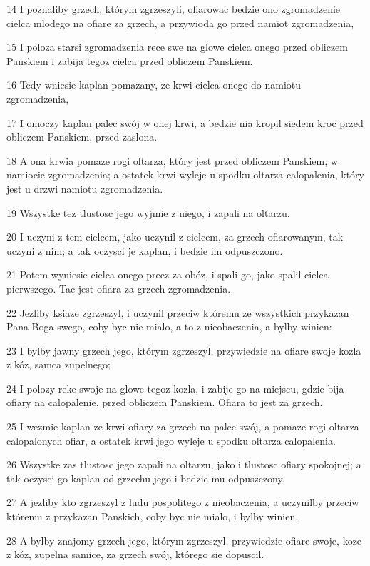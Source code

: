 \par 14 I poznaliby grzech, którym zgrzeszyli, ofiarowac bedzie ono zgromadzenie cielca mlodego na ofiare za grzech, a przywioda go przed namiot zgromadzenia,
\par 15 I poloza starsi zgromadzenia rece swe na glowe cielca onego przed obliczem Panskiem i zabija tegoz cielca przed obliczem Panskiem.
\par 16 Tedy wniesie kaplan pomazany, ze krwi cielca onego do namiotu zgromadzenia,
\par 17 I omoczy kaplan palec swój w onej krwi, a bedzie nia kropil siedem kroc przed obliczem Panskiem, przed zaslona.
\par 18 A ona krwia pomaze rogi oltarza, który jest przed obliczem Panskiem, w namiocie zgromadzenia; a ostatek krwi wyleje u spodku oltarza calopalenia, który jest u drzwi namiotu zgromadzenia.
\par 19 Wszystke tez tlustosc jego wyjmie z niego, i zapali na oltarzu.
\par 20 I uczyni z tem cielcem, jako uczynil z cielcem, za grzech ofiarowanym, tak uczyni z nim; a tak oczysci je kaplan, i bedzie im odpuszczono.
\par 21 Potem wyniesie cielca onego precz za obóz, i spali go, jako spalil cielca pierwszego. Tac jest ofiara za grzech zgromadzenia.
\par 22 Jezliby ksiaze zgrzeszyl, i uczynil przeciw któremu ze wszystkich przykazan Pana Boga swego, coby byc nie mialo, a to z nieobaczenia, a bylby winien:
\par 23 I bylby jawny grzech jego, którym zgrzeszyl, przywiedzie na ofiare swoje kozla z kóz, samca zupelnego;
\par 24 I polozy reke swoje na glowe tegoz kozla, i zabije go na miejscu, gdzie bija ofiary na calopalenie, przed obliczem Panskiem. Ofiara to jest za grzech.
\par 25 I wezmie kaplan ze krwi ofiary za grzech na palec swój, a pomaze rogi oltarza calopalonych ofiar, a ostatek krwi jego wyleje u spodku oltarza calopalenia.
\par 26 Wszystke zas tlustosc jego zapali na oltarzu, jako i tlustosc ofiary spokojnej; a tak oczysci go kaplan od grzechu jego i bedzie mu odpuszczony.
\par 27 A jezliby kto zgrzeszyl z ludu pospolitego z nieobaczenia, a uczynilby przeciw któremu z przykazan Panskich, coby byc nie mialo, i bylby winien,
\par 28 A bylby znajomy grzech jego, którym zgrzeszyl, przywiedzie ofiare swoje, koze z kóz, zupelna samice, za grzech swój, którego sie dopuscil.
